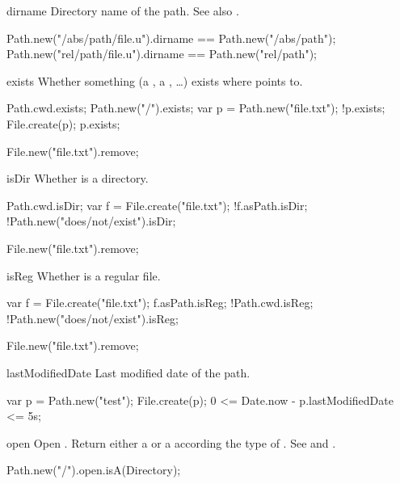 \begin{urbiscriptapi}
\item[dirname]%
  Directory name of the path.  See also .
\begin{urbiassert}
Path.new("/abs/path/file.u").dirname == Path.new("/abs/path");
Path.new("rel/path/file.u").dirname  == Path.new("rel/path");
\end{urbiassert}


\item[exists]%
  Whether something (a , a , \ldots) exists
  where \this points to.
\begin{urbiassert}
Path.cwd.exists;
Path.new("/").exists;
var p = Path.new("file.txt");
!p.exists;
File.create(p);
p.exists;
\end{urbiassert}
\begin{urbicomment}
File.new("file.txt").remove;
\end{urbicomment}


\item[isDir]%
  Whether \this is a directory.
\begin{urbiassert}
Path.cwd.isDir;
var f = File.create("file.txt");
!f.asPath.isDir;
!Path.new("does/not/exist").isDir;
\end{urbiassert}
\begin{urbicomment}
File.new("file.txt").remove;
\end{urbicomment}


\item[isReg]%
  Whether \this is a regular file.
\begin{urbiassert}
var f = File.create("file.txt");
 f.asPath.isReg;
!Path.cwd.isReg;
!Path.new("does/not/exist").isReg;
\end{urbiassert}
\begin{urbicomment}
File.new("file.txt").remove;
\end{urbicomment}


\item[lastModifiedDate]%
  Last modified date of the path.
\begin{urbiassert}
var p = Path.new("test");
File.create(p);
0 <= Date.now - p.lastModifiedDate <= 5s;
\end{urbiassert}


\item[open] Open \this. Return either a  or a 
  according the type of \this. See  and
  .
\begin{urbiassert}
Path.new("/").open.isA(Directory);


\end{urbiassert}
\end{urbiscriptapi}
